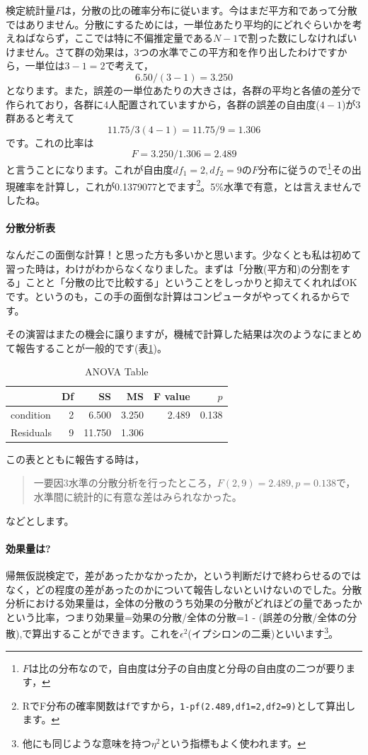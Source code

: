 \documentclass{ltjsarticle}
\begin{document}
検定統計量$F$は，分散の比の確率分布に従います。今はまだ平方和であって分散ではありません。分散にするためには，一単位あたり平均的にどれぐらいかを考えねばならず，ここでは特に不偏推定量である$N-1$で割った数にしなければいけません。さて群の効果は，3つの水準でこの平方和を作り出したわけですから，一単位は$3-1=2$で考えて，
$$ 6.50 / (3-1) = 3.250$$
となります。また，誤差の一単位あたりの大きさは，各群の平均と各値の差分で作られており，各群に4人配置されていますから，各群の誤差の自由度($4-1$)が3群あると考えて
$$ 11.75/3(4-1)=11.75/9 = 1.306$$
です。これの比率は
$$F = 3.250/1.306 = 2.489$$
と言うことになります。これが自由度$df_1 =2,df_2 = 9$の$F$分布に従うので\footnote{$F$は比の分布なので，自由度は分子の自由度と分母の自由度の二つが要ります，}その出現確率を計算し，これが0.1379077とでます\footnote{RでF分布の確率関数は\texttt{f}ですから，\texttt{1-pf(2.489,df1=2,df2=9)}として算出します。}。5\%水準で有意，とは言えませんでしたね。
\paragraph{分散分析表}
なんだこの面倒な計算！と思った方も多いかと思います。少なくとも私は初めて習った時は，わけがわからなくなりました。まずは「分散(平方和)の分割をする」ことと「分散の比で比較する」ということをしっかりと抑えてくれればOKです。というのも，この手の面倒な計算はコンピュータがやってくれるからです。

その演習はまたの機会に譲りますが，機械で計算した結果は次のようなにまとめて報告することが一般的です(表\ref{tbl::21_05})。
\begin{table}[ht]
    \centering
    \caption{ANOVA Table} 
    \begin{tabular}{lrrrrr}
      \hline
     & Df & SS & MS & F value & $p$ \\ 
      \hline
    condition   & 2 & 6.500 & 3.250 & 2.489 & 0.138 \\ 
      Residuals   & 9 & 11.750 & 1.306 &  &  \\ 
       \hline
    \end{tabular}
    \label{tbl::21_05}
    \end{table}
この表とともに報告する時は，
\begin{quote}
    一要因3水準の分散分析を行ったところ，$F(2,9)=2.489,p=0.138$で，水準間に統計的に有意な差はみられなかった。
\end{quote}
などとします。

\paragraph{効果量は?}
帰無仮説検定で，差があったかなかったか，という判断だけで終わらせるのではなく，どの程度の差があったのかについて報告しないといけないのでした。分散分析における効果量は，全体の分散のうち効果の分散がどれほどの量であったかという比率，つまり効果量=効果の分散/全体の分散=1 - (誤差の分散/全体の分散),で算出することができます。これを$\epsilon^2$(イプシロンの二乗)といいます\footnote{他にも同じような意味を持つ$\eta^2$という指標もよく使われます。}。
\end{document}
